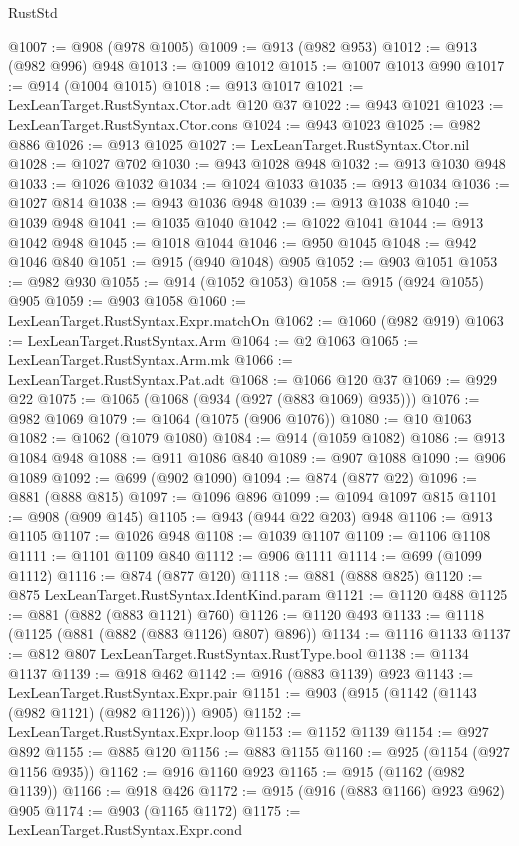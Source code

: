\begin{lexlean}{RustStd}
\begin{coremodule}
@1007 := @908 (@978 @1005)
@1009 := @913 (@982 @953)
@1012 := @913 (@982 @996) @948
@1013 := @1009 @1012
@1015 := @1007 @1013 @990
@1017 := @914 (@1004 @1015)
@1018 := @913 @1017
@1021 := LexLeanTarget.RustSyntax.Ctor.adt @120 @37
@1022 := @943 @1021
@1023 := LexLeanTarget.RustSyntax.Ctor.cons
@1024 := @943 @1023
@1025 := @982 @886
@1026 := @913 @1025
@1027 := LexLeanTarget.RustSyntax.Ctor.nil
@1028 := @1027 @702
@1030 := @943 @1028 @948
@1032 := @913 @1030 @948
@1033 := @1026 @1032
@1034 := @1024 @1033
@1035 := @913 @1034
@1036 := @1027 @814
@1038 := @943 @1036 @948
@1039 := @913 @1038
@1040 := @1039 @948
@1041 := @1035 @1040
@1042 := @1022 @1041
@1044 := @913 @1042 @948
@1045 := @1018 @1044
@1046 := @950 @1045
@1048 := @942 @1046 @840
@1051 := @915 (@940 @1048) @905
@1052 := @903 @1051
@1053 := @982 @930
@1055 := @914 (@1052 @1053)
@1058 := @915 (@924 @1055) @905
@1059 := @903 @1058
@1060 := LexLeanTarget.RustSyntax.Expr.matchOn
@1062 := @1060 (@982 @919)
@1063 := LexLeanTarget.RustSyntax.Arm
@1064 := @2 @1063
@1065 := LexLeanTarget.RustSyntax.Arm.mk
@1066 := LexLeanTarget.RustSyntax.Pat.adt
@1068 := @1066 @120 @37
@1069 := @929 @22
@1075 := @1065 (@1068 (@934 (@927 (@883 @1069) @935)))
@1076 := @982 @1069
@1079 := @1064 (@1075 (@906 @1076))
@1080 := @10 @1063
@1082 := @1062 (@1079 @1080)
@1084 := @914 (@1059 @1082)
@1086 := @913 @1084 @948
@1088 := @911 @1086 @840
@1089 := @907 @1088
@1090 := @906 @1089
@1092 := @699 (@902 @1090)
@1094 := @874 (@877 @22)
@1096 := @881 (@888 @815)
@1097 := @1096 @896
@1099 := @1094 @1097 @815
@1101 := @908 (@909 @145)
@1105 := @943 (@944 @22 @203) @948
@1106 := @913 @1105
@1107 := @1026 @948
@1108 := @1039 @1107
@1109 := @1106 @1108
@1111 := @1101 @1109 @840
@1112 := @906 @1111
@1114 := @699 (@1099 @1112)
@1116 := @874 (@877 @120)
@1118 := @881 (@888 @825)
@1120 := @875 LexLeanTarget.RustSyntax.IdentKind.param
@1121 := @1120 @488
@1125 := @881 (@882 (@883 @1121) @760)
@1126 := @1120 @493
@1133 := @1118 (@1125 (@881 (@882 (@883 @1126) @807) @896))
@1134 := @1116 @1133
@1137 := @812 @807 LexLeanTarget.RustSyntax.RustType.bool
@1138 := @1134 @1137
@1139 := @918 @462
@1142 := @916 (@883 @1139) @923
@1143 := LexLeanTarget.RustSyntax.Expr.pair
@1151 := @903 (@915 (@1142 (@1143 (@982 @1121) (@982 @1126))) @905)
@1152 := LexLeanTarget.RustSyntax.Expr.loop
@1153 := @1152 @1139
@1154 := @927 @892
@1155 := @885 @120
@1156 := @883 @1155
@1160 := @925 (@1154 (@927 @1156 @935))
@1162 := @916 @1160 @923
@1165 := @915 (@1162 (@982 @1139))
@1166 := @918 @426
@1172 := @915 (@916 (@883 @1166) @923 @962) @905
@1174 := @903 (@1165 @1172)
@1175 := LexLeanTarget.RustSyntax.Expr.cond

\end{coremodule}
\end{lexlean}
